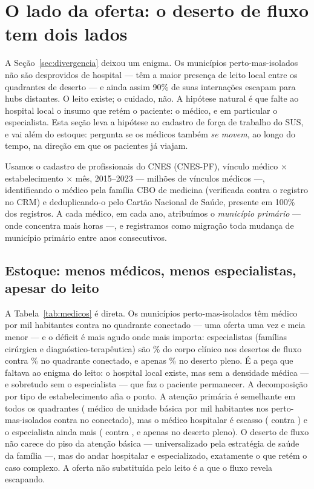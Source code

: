 
\section{O lado da oferta: o deserto de fluxo tem dois lados}
\label{sec:medicos}

A Seção~\ref{sec:divergencia} deixou um enigma. Os municípios perto-mas-isolados
não são desprovidos de hospital --- têm a maior presença de leito local entre os
quadrantes de deserto --- e ainda assim 90\% de suas internações escapam para
hubs distantes. O leito existe; o cuidado, não. A hipótese natural é que falte ao
hospital local o insumo que retém o paciente: o médico, e em particular o
especialista. Esta seção leva a hipótese ao cadastro de força de trabalho do SUS,
e vai além do estoque: pergunta se os médicos também \emph{se movem}, ao longo do
tempo, na direção em que os pacientes já viajam.

Usamos o cadastro de profissionais do CNES (CNES-PF), vínculo médico $\times$
estabelecimento $\times$ mês, 2015--2023 --- \valNvinc{} milhões de vínculos
médicos ---, identificando o médico pela família CBO de medicina (verificada
contra o registro no CRM) e deduplicando-o pelo Cartão Nacional de Saúde, presente
em 100\% dos registros.%
A cada médico, em cada ano, atribuímos o \emph{município primário} --- onde
concentra mais horas ---, e registramos como migração toda mudança de município
primário entre anos consecutivos.

\subsection{Estoque: menos médicos, menos especialistas, apesar do leito}

A Tabela~\ref{tab:medicos} é direta. Os municípios perto-mas-isolados têm
\valFOmed{} médico por mil habitantes contra \valNEmed{} no quadrante conectado
--- uma oferta uma vez e meia menor --- e o déficit é mais agudo onde mais
importa: especialistas (famílias cirúrgica e diagnóstico-terapêutica) são
\valFOesp\% do corpo clínico nos desertos de fluxo contra \valNEesp\% no quadrante
conectado, e apenas \valBOesp\% no deserto pleno.%
É a peça que faltava ao enigma do leito: o hospital local existe, mas sem a
densidade médica --- e sobretudo sem o especialista --- que faz o paciente
permanecer. A decomposição por tipo de estabelecimento afia o ponto. A atenção
primária é semelhante em todos os quadrantes (\valFOprim{} médico de unidade
básica por mil habitantes nos perto-mas-isolados contra \valNEprim{} no
conectado), mas o médico hospitalar é escasso (\valFOhospd{} contra \valNEhospd)
e o especialista ainda mais (\valFOespd{} contra \valNEespd, e apenas \valBOespd{}
no deserto pleno).%
O deserto de fluxo não carece do piso da atenção básica --- universalizado pela
estratégia de saúde da família ---, mas do andar hospitalar e especializado,
exatamente o que retém o caso complexo. A oferta não substituída pelo leito é
a que o fluxo revela escapando.

